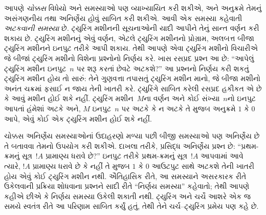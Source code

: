\documentclass[../../../include/open-logic-section]{subfiles}
\begin{document}
આપણે \emph{ચોક્કસ} વિધેયો અને સમસ્યાઓ પણ વ્યાખ્યાયિત
કરી શકીએ, અને અનુક્રમે તેમનું અસંગણનીય તથા અનિર્ણેય
હોવું સાબિત કરી શકીએ. આવી એક સમસ્યા કહેવાતી
\emph{અટકવાની સમસ્યા} છે. ટ્યુરિંગ મશીનની સૂચનાઓની
યાદી આપીને તેનું સાન્ત વર્ણન કરી શકાય છે. ટ્યુરિંગ
મશીનનું એવું વર્ણન, એટલે ટ્યુરિંગ મશીનનો પ્રોગ્રામ,
અલબત્ત બીજા ટ્યુરિંગ મશીનને ઇનપુટ તરીકે આપી શકાય.
તેથી આપણે એવા ટ્યુરિંગ મશીનો વિચારીએ જે બીજાં
ટ્યુરિંગ મશીનો વિશેના પ્રશ્નોનો નિર્ણય કરે. ખાસ
રસપ્રદ પ્રશ્ન આ છે: ``આપેલું ટ્યુરિંગ મશીન ઇનપુટ~$n$
પર શરૂ કરતાં છેવટે અટકશે?'' આ પ્રશ્નનો નિર્ણય
કરી શકતું ટ્યુરિંગ મશીન હોય તો સારું: તેને ગુણવત્તા
તપાસતું ટ્યુરિંગ મશીન માનો, જે બીજા મશીનો અનંત
ચક્રમાં ફસાઈ ન જાય તેની ખાતરી કરે. ટ્યુરિંગે સાબિત
કરેલી રસપ્રદ હકીકત એ છે કે આવું મશીન હોઈ શકે નહીં.
ટ્યુરિંગ મશીન~$M$ના વર્ણન અને કોઈ સંખ્યા~$n$નો
ઇનપુટ આપતાં હંમેશાં અટકે અને, $M$ ઇનપુટ~$n$ પર
અટકે કે ન અટકે તે મુજબ અનુક્રમે $1$ કે $0$ આપે,
એવું કોઈ એક ટ્યુરિંગ મશીન હોઈ શકે નહીં.

ચોક્કસ અનિર્ણેય સમસ્યાઓનાં ઉદાહરણો મળ્યા પછી બીજી
સમસ્યાઓ પણ અનિર્ણેય છે તે બતાવવા તેમનો ઉપયોગ
કરી શકીએ. દાખલા તરીકે, પ્રસિદ્ધ અનિર્ણેય પ્રશ્ન છે:
``પ્રથમ-ક્રમનું સૂત્ર~$!A$ પ્રામાણ્ય ધરાવે છે?''
ઇનપુટ તરીકે પ્રથમ-ક્રમનું સૂત્ર~$!A$ આપવામાં આવે
ત્યારે, $!A$ પ્રામાણ્ય ધરાવે છે કે નહીં તે મુજબ $1$ કે
$0$ આઉટપુટ સાથે અટકશે તેની ખાતરી હોય એવું કોઈ ટ્યુરિંગ
મશીન નથી. ઐતિહાસિક રીતે, આ સમસ્યાને અસરકારક રીતે
ઉકેલવાની પ્રક્રિયા શોધવાના પ્રશ્નને સાદી રીતે ``નિર્ણય
સમસ્યા'' કહેવાતો; તેથી આપણે કહીએ છીએ કે નિર્ણય સમસ્યા
ઉકેલી શકાતી નથી. ટ્યુરિંગ અને ચર્ચે આશરે એક જ સમયે સ્વતંત્ર
રીતે આ પરિણામ સાબિત કર્યું હતું, તેથી તેને ચર્ચ--ટ્યુરિંગ
પ્રમેય પણ કહે છે.
\end{document}
